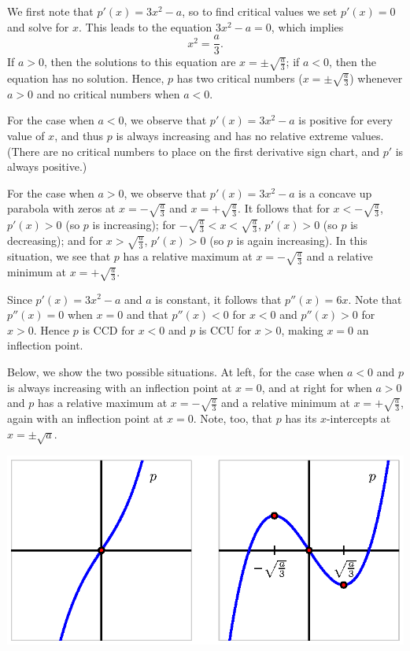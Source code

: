 \begin{activitySolution}
\ba
  \item We first note that $p'(x) = 3x^2 - a$, so to find critical values we set $p'(x) = 0$ and solve for $x$.  This leads to the equation $3x^2 - a = 0$, which implies 
  $$x^2 = \frac{a}{3}.$$
  If $a > 0$, then the solutions to this equation are $x = \pm \sqrt{\frac{a}{3}}$; if $a < 0$, then the equation has no solution.  Hence, $p$ has two critical numbers ($x = \pm \sqrt{\frac{a}{3}}$) whenever $a > 0$ and no critical numbers when $a < 0$.
  \item For the case when $a < 0$, we observe that $p'(x) = 3x^2 - a$ is positive for every value of $x$, and thus $p$ is always increasing and has no relative extreme values.  (There are no critical numbers to place on the first derivative sign chart, and $p'$ is always positive.)
  
  For the case when $a > 0$, we observe that $p'(x) = 3x^2 - a$ is a concave up parabola with zeros at $x = -\sqrt{\frac{a}{3}}$ and $x = +\sqrt{\frac{a}{3}}$.  It follows that for $x < -\sqrt{\frac{a}{3}}$, $p'(x) > 0$ (so $p$ is increasing); for $-\sqrt{\frac{a}{3}} < x < \sqrt{\frac{a}{3}}$, $p'(x) > 0$ (so $p$ is decreasing); and for $x > \sqrt{\frac{a}{3}}$, $p'(x) > 0$ (so $p$ is again increasing).  In this situation, we see that $p$ has a relative maximum at $x = -\sqrt{\frac{a}{3}}$ and a relative minimum at $x = +\sqrt{\frac{a}{3}}$.
  \item Since $p'(x) = 3x^2 - a$ and $a$ is constant, it follows that $p''(x) = 6x$.  Note that $p''(x) = 0$ when $x = 0$ and that $p''(x) < 0$ for $x < 0$ and $p''(x) > 0$ for $x > 0$.  Hence $p$ is CCD for $x < 0$ and $p$ is CCU for $x > 0$, making $x = 0$ an inflection point.
  \item Below, we show the two possible situations. At left, for the case when $a < 0$ and $p$ is always increasing with an inflection point at $x = 0$, and at right for when $a > 0$ and $p$ has a relative maximum at $x = -\sqrt{\frac{a}{3}}$ and a relative minimum at $x = +\sqrt{\frac{a}{3}}$, again with an inflection point at $x = 0$.  Note, too, that $p$ has its $x$-intercepts at $x = \pm \sqrt{a}$.
  \begin{center}
  	\includegraphics{figures/3_2_Act1Soln.eps}
  \end{center}
\ea
\end{activitySolution}
\aftera